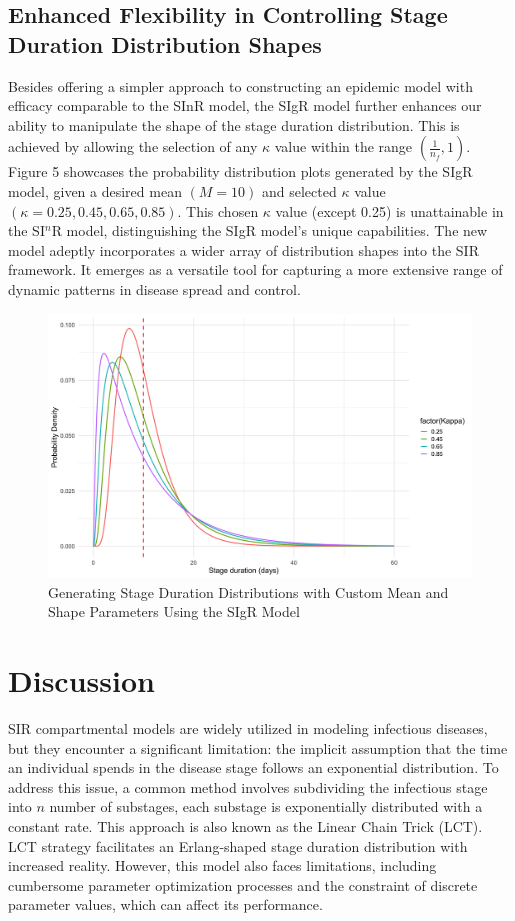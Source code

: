 \documentclass[12pt]{article}
\begin{document}
\subsection{Enhanced Flexibility in Controlling Stage Duration Distribution Shapes}
Besides offering a simpler approach to constructing an epidemic model with efficacy comparable to the SInR model, the SIgR model further enhances our ability to manipulate the shape of the stage duration distribution. This is achieved by allowing the selection of any $\kappa$ value within the range $(\frac{1}{n_f}, 1)$. Figure 5 showcases the probability distribution plots generated by the SIgR model, given a desired mean $(M=10)$ and selected $\kappa$ value $(\kappa = 0.25, 0.45, 0.65, 0.85)$. This chosen $\kappa$ value (except 0.25) is unattainable in the SI$^n$R model, distinguishing the SIgR model's unique capabilities. The new model adeptly incorporates a wider array of distribution shapes into the SIR framework. It emerges as a versatile tool for capturing a more extensive range of dynamic patterns in disease spread and control.
\begin{figure}[h]
    \centering
    \includegraphics[width= \textwidth]{4.4.2.png}
    \caption{Generating Stage Duration Distributions with Custom Mean and Shape Parameters Using the SIgR Model}
\end{figure}

    


\section{Discussion}
SIR compartmental models are widely utilized in modeling infectious diseases, but they encounter a significant limitation: the implicit assumption that the time an individual spends in the disease stage follows an exponential distribution. To address this issue, a common method involves subdividing the infectious stage into $n$ number of substages, each substage is exponentially distributed with a constant rate. This approach is also known as the Linear Chain Trick (LCT). LCT strategy facilitates an Erlang-shaped stage duration distribution with increased reality. However, this model also faces limitations, including cumbersome parameter optimization processes and the constraint of discrete parameter values, which can affect its performance.
\end{document}
